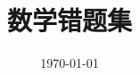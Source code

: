 \documentclass[a4paper]{ctexart}
\title{\heiti\zihao{2} 数学错题集}
\date{\today}
\begin{document}
    \maketitle
    \thispagestyle{empty}

    \newpage

    \setcounter{page}{1}
    \cfoot{\thepage}

    \renewcommand{\footrulewidth}{1pt}
    \tableofcontents

    \newpage


    \setcounter{page}{1}


    \begin{sloppy}
        \begin{enumerate}
            
        \end{enumerate}
    \end{sloppy}
\end{document}
